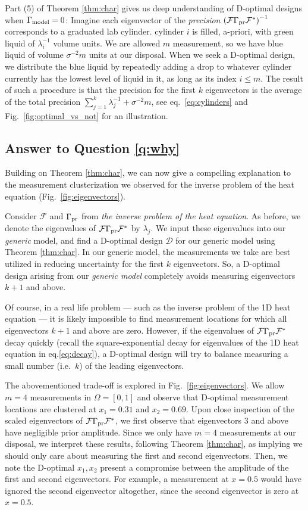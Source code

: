 \documentclass[ba]{imsart}
\newcommand{\fwd}{\mathcal{F}}
\newcommand{\opt}{\mathcal{D}}
\theoremstyle{plain}
\theoremstyle{definition}
\theoremstyle{remark}
\begin{document}
Part (5) of Theorem \ref{thm:char} gives us deep understanding of
D-optimal designs when $\Gamma_{\textup{model}} = 0$: Imagine each eigenvector of the
\emph{precision} $\left(\fwd \prcov \fwd^*\right )^{-1}$ corresponds
to a graduated lab cylinder. cylinder $i$ is filled, a-priori, with green liquid of
$\lambda_i^{-1}$ volume units. We are allowed $m$ measurement, so we
have blue liquid of volume $\sigma^{-2}m$ units at our disposal. When
we seek a D-optimal design, we distribute the blue liquid by
repeatedly adding a drop to whatever cylinder currently has the lowest
level of liquid in it, as long as its index $i \leq m$. The result of
such a procedure is that the precision for the first $k$ eigenvectors
is the average of the total precision $\sum_{j=1}^k \lambda_j^{-1} +
\sigma^{-2}m$, see eq.~\eqref{eq:cylinders} and
Fig.~\ref{fig:optimal_vs_not} for an illustration.




\subsection{Answer to Question \ref{q:why}}\label{subsec:why}
Building on Theorem \ref{thm:char}, we can now give a compelling
explanation to the measurement clusterization we observed for the
inverse problem of the heat equation (Fig.~\ref{fig:eigenvectors}).

Consider $\fwd$ and $\Gamma_{\textup{pr}}$ from \emph{the inverse problem of the
heat equation}. As before, we denote the eigenvalues of
$\fwd\prcov\fwd^*$ by $\lambda_j$. We input these eigenvalues into our
\emph{generic} model, and find a D-optimal design $\opt$ for our
generic model using Theorem \ref{thm:char}. In our generic model, the
measurements we take are best utilized in reducing uncertainty for the
first $k$ eigenvectors. So, a D-optimal design arising from our
\emph{generic model} completely avoids measuring eigenvectors $k+1$
and above.

Of course, in a real life problem --- such as the inverse problem of
the 1D heat equation --- it is likely impossible to find measurement
locations for which all eigenvectors $k+1$ and above are
zero. However, if the eigenvalues of $\fwd\prcov\fwd^*$ decay quickly
(recall the square-exponential decay for eigenvalues of the 1D heat
equation in eq.\eqref{eq:decay}), a D-optimal design will try to
balance measuring a small number (i.e.~$k$) of the leading
eigenvectors.

The abovementioned trade-off is explored in
Fig.~\ref{fig:eigenvectors}. We allow $m=4$ measurements in $\Omega =
[0,1]$ and observe that D-optimal measurement locations are clustered
at $x_1 = 0.31$ and $x_2 = 0.69$. Upon close inspection of the scaled
eigenvectors of $\fwd \prcov \fwd^*$, we first observe that
eigenvectors $3$ and above have negligible prior amplitude. Since we
only have $m=4$ measurements at our disposal, we interpret these
results, following Theorem \ref{thm:char}, as implying we should only
care about measuring the first and second eigenvectors. Then, we note
the D-optimal $x_1,x_2$ present a compromise between the amplitude of
the first and second eigenvectors. For example, a measurement at
$x=0.5$ would have ignored the second eigenvector altogether, since
the second eigenvector is zero at $x=0.5$.
\end{document}
